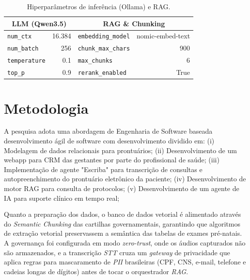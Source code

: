\documentclass[12pt]{article}
\begin{document}
\begin{table}[H]
  \centering
  \caption{Hiperparâmetros de inferência (Ollama) e RAG.}
  \label{tab:hyperparams}
  \small
  \begin{tabularx}{\textwidth}{l r | l r}
    \toprule
    \multicolumn{2}{c}{\textbf{LLM (Qwen3.5)}} & \multicolumn{2}{c}{\textbf{RAG \& Chunking}}                                                 \\
    \midrule
    \texttt{num\_ctx}                          & 16.384                                       & \texttt{embedding\_model}  & nomic-embed-text \\
    \texttt{num\_batch}                        & 256                                          & \texttt{chunk\_max\_chars} & 900              \\
    \texttt{temperature}                       & 0.1                                          & \texttt{max\_chunks}       & 6                \\
    \texttt{top\_p}                            & 0.9                                          & \texttt{rerank\_enabled}   & True             \\
    \bottomrule
  \end{tabularx}
\end{table}


\section{Metodologia}

A pesquisa adota uma abordagem de Engenharia de Software baseada desenvolvimento ágil de software com desenvolvimento dividido em:
(i) Modelagem de dados relacionais para prontuários;
(ii) Desenvolvimento de um webapp para CRM das gestantes por parte do profissional de saúde;
(iii) Implementação de agente "Escriba"  para transcrição de consultas e autopreenchimento do prontuário eletrônico da paciente;
(iv) Desenvolvimento de motor RAG para consulta de protocolos;
(v) Desenvolvimento de um agente de IA para suporte clínico em tempo real;


Quanto a preparação dos dados, o banco de dados vetorial é alimentado através do \textit{Semantic Chunking} das cartilhas governamentais, garantindo que algoritmos de extração vetorial preservassem a semântica das tabelas de exames pré-natais.
A governança foi configurada em modo \textit{zero-trust}, onde os áudios capturados não são armazenados, e a transcrição \textit{STT} cruza um \textit{gateway} de privacidade que aplica regras para mascaramento de \textit{PII} brasileiras (CPF, CNS, e-mail, telefone e cadeias longas de dígitos) antes de tocar o orquestrador \textit{RAG}.
\end{document}
